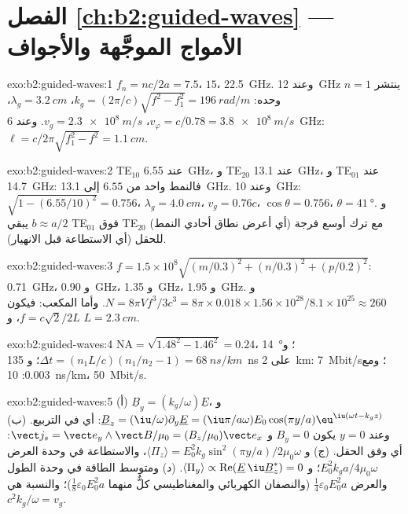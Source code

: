 \section*{الفصل \ref{ch:b2:guided-waves} --- الأمواج الموجَّهة والأجواف}

\begin{solution}{exo:b2:guided-waves:1}
$f_n = nc/2a = 7.5$، $15$، \qty{22.5}{GHz}. وعند \qty{12}{GHz} ينتشر $n = 1$ وحده: $k_g =
(2\pi/c)\sqrt{f^2 - f_1^2} = \qty{196}{rad/m}$، $\lambda_g = \qty{3.2}{cm}$، $v_\varphi = c/0.78
= \qty{3.8e8}{m/s}$، $v_g = \qty{2.3e8}{m/s}$. وعند \qty{6}{GHz}: $\ell = c/2\pi\sqrt{f_1^2 -
f^2} = \qty{1.1}{cm}$.
\end{solution}

\begin{solution}{exo:b2:guided-waves:2}
TE$_{10}$ عند \qty{6.55}{GHz}، و TE$_{20}$ عند \qty{13.1}{GHz}، و TE$_{01}$
عند \qty{14.7}{GHz}: فالنمط واحد من $6.55$ إلى \qty{13.1}{GHz}. وعند \qty{10}{GHz}: $\sqrt{1 - (6.55/10)^2} =
0.756$، $\lambda_g = \qty{4.0}{cm}$، $v_g = 0.76c$، $\cos\theta = 0.756$، $\theta = \qty{41}{\degree}$.
و $b \approx a/2$ يبقي TE$_{01}$ فوق TE$_{20}$ (أي أعرض نطاق أحادي النمط)
مع ترك أوسع فرجة للحقل (أي الاستطاعة قبل الانهيار).
\end{solution}

\begin{solution}{exo:b2:guided-waves:3}
$f = 1.5 \times 10^8\sqrt{(m/0.3)^2 + (n/0.3)^2 + (p/0.2)^2}$: \qty{0.71}{GHz}، و \qty{0.90}{GHz}،
و \qty{1.35}{GHz}، و \qty{1.95}{GHz}. و $N = 8\pi Vf^3/3c^3 = 8\pi \times 0.018 \times 1.56 \times 10^{28}/
8.1 \times 10^{25} \approx 260$. وأما المكعب: فيكون $f = c\sqrt2/2L$، و $L = \qty{2.3}{cm}$.
\end{solution}

\begin{solution}{exo:b2:guided-waves:4}
$\mathrm{NA} = \sqrt{1.48^2 - 1.46^2} = 0.24$، \qty{14}{\degree}؛ و $\Delta t = (n_1L/c)(n_1/n_2
- 1) = \qty{68}{ns/km}$؛ و \qty{135}{ns} على \qty{2}{km}: \qty{7}{Mbit/s}؛ ومع $0.003$:
\qty{10}{ns/km}، \qty{50}{Mbit/s}.
\end{solution}

\begin{solution}{exo:b2:guided-waves:5}
(أ) $\underline B_y = (k_g/\omega)\underline E$، و $\underline B_z = (\iu/\omega)\partial_y\underline E = (\iu\pi/a\omega)
E_0\cos(\pi y/a)\eu^{\iu(\omega t - k_gz)}$: أي في التربيع. (ب) وعند $y = 0$ يكون $B_y = 0$ و
$\vect j_s = \vect e_y\wedge\vect B/\mu_0 = (B_z/\mu_0)\vect e_x$: أي وفق الحقل. (ج)
و $\langle\Pi_z\rangle = E_0^2k_g\sin^2(\pi y/a)/2\mu_0\omega$، والاستطاعة في وحدة العرض
$E_0^2k_ga/4\mu_0\omega$؛ و $\langle\Pi_y\rangle \propto \operatorname{Re}(\underline E\,\iu\underline B_z^*)
= 0$. (د) ومتوسط الطاقة في وحدة الطول والعرض $\tfrac14\varepsilon_0E_0^2a$ (والنصفان
الكهربائي والمغناطيسي كلٌّ منهما $\tfrac18\varepsilon_0E_0^2a$)؛ والنسبة هي $c^2k_g/\omega = v_g$.
\end{solution}

